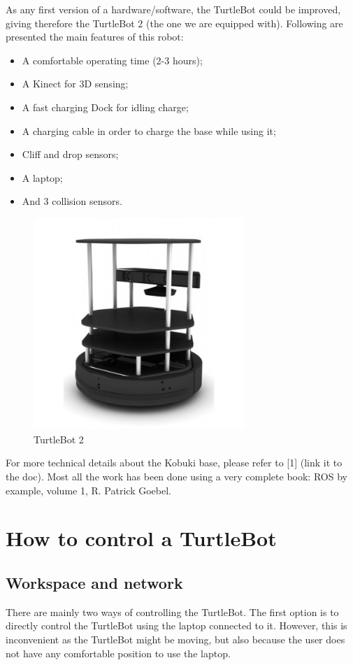 \documentclass[aps,letterpaper,11pt]{revtex4}
\begin{document}
As any first version of a hardware/software, the TurtleBot could be improved, giving therefore the TurtleBot 2 (the one we are equipped with). Following are presented the main features of this robot:

\begin{itemize}
\item {A comfortable operating time (2-3 hours);}
\item {A Kinect for 3D sensing;}
\item {A fast charging Dock for idling charge;}
\item {A charging cable in order to charge the base while using it;}
\item {Cliff and drop sensors;}
\item {A laptop;}
\item {And 3 collision sensors.}
\end{itemize}

\begin{figure}[H]
	\centering
	\includegraphics[height=8cm]{turtlebot-2-robot-mobile-ros.jpg}
	\caption{TurtleBot 2}
	\label{fig:Robot Components}    
\end{figure}

For more technical details about the Kobuki base, please refer to [1] (link it to the doc). Most all the work has been done using a very complete book: ROS by example, volume 1, R. Patrick Goebel.


\section{How to control a TurtleBot}
\subsection{Workspace and network}
There are mainly two ways of controlling the TurtleBot. 
The first option is to directly control the TurtleBot using the laptop connected to it. However, this is inconvenient as the TurtleBot might be moving, but also because the user does not have any comfortable position to use the laptop.
\end{document}
